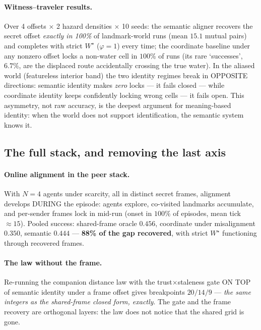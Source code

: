 \documentclass{article}
\newcommand{\wstar}{W^{\star}}
\begin{document}
\paragraph{Witness--traveler results.} Over 4 offsets $\times$ 2
hazard densities $\times$ 10 seeds: the semantic aligner recovers the
secret offset \emph{exactly in 100\%} of landmark-world runs
(mean $15.1$ mutual pairs) and completes with strict $\wstar$
($\varphi{=}1$) every time; the coordinate baseline under any nonzero
offset locks a non-water cell in $100\%$ of runs (its rare
`successes', $6.7\%$, are the displaced route accidentally crossing
the true water). In the aliased world (featureless interior band) the
two identity regimes break in OPPOSITE directions: semantic identity
makes \emph{zero} locks --- it fails closed --- while coordinate
identity keeps confidently locking wrong cells --- it fails open.
This asymmetry, not raw accuracy, is the deepest argument for
meaning-based identity: when the world does not support
identification, the semantic system knows it.

\subsection{The full stack, and removing the last axis}
\label{sec:stack}

\paragraph{Online alignment in the peer stack.} With $N{=}4$ agents
under scarcity, all in distinct secret frames, alignment develops
DURING the episode: agents explore, co-visited landmarks accumulate,
and per-sender frames lock in mid-run (onset in $100\%$ of episodes,
mean tick ${\approx}15$). Pooled success: shared-frame oracle
$0.456$, coordinate under misalignment $0.350$, semantic $0.444$ ---
\textbf{88\% of the gap recovered}, with strict $\wstar$ functioning
through recovered frames.

\paragraph{The law without the frame.} Re-running the companion
distance law with the trust$\times$staleness gate ON TOP of semantic
identity under a frame offset gives breakpoints $20/14/9$ ---
\emph{the same integers as the shared-frame closed form, exactly}.
The gate and the frame recovery are orthogonal layers: the law does
not notice that the shared grid is gone.
\end{document}
